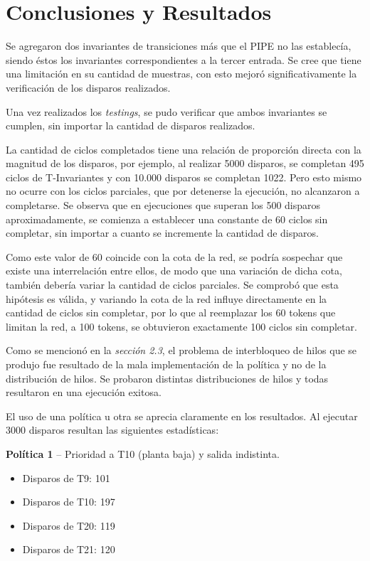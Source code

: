 \documentclass[12pt,a4paper]{article}
\begin{document}
\section{Conclusiones y Resultados}
Se agregaron dos invariantes de transiciones más que el PIPE no las establecía, siendo éstos los invariantes correspondientes a la tercer entrada. Se cree que tiene una limitación en su cantidad de muestras, con esto mejoró significativamente la verificación de los disparos realizados.

Una vez realizados los \emph{testings}, se pudo verificar que ambos invariantes se cumplen, sin importar la cantidad de disparos realizados.

La cantidad  de ciclos completados tiene una relación de proporción directa con la magnitud de los disparos, por ejemplo, al realizar 5000 disparos, se completan 495 ciclos de T-Invariantes y con 10.000 disparos se completan 1022. Pero esto mismo no ocurre con los ciclos parciales, que por detenerse la ejecución, no alcanzaron a completarse.
Se observa que en ejecuciones que superan los 500 disparos aproximadamente, se comienza a establecer una constante de 60 ciclos sin completar, sin importar a cuanto se incremente la cantidad de disparos.

Como este valor de 60 coincide con la cota de la red, se podría sospechar que existe una interrelación entre ellos, de modo que una variación de dicha cota, también debería variar la cantidad de ciclos parciales. Se comprobó que esta hipótesis es válida, y variando la cota de la red influye directamente en la cantidad de ciclos sin completar, por lo que al reemplazar los 60 tokens que limitan la red, a 100 tokens, se obtuvieron exactamente 100 ciclos sin completar.

Como se mencionó en la \emph{sección 2.3}, el problema de interbloqueo de hilos que se produjo fue resultado de la mala implementación de la política y no de la distribución de hilos. Se probaron distintas distribuciones de hilos y todas resultaron en una ejecución exitosa.

El uso de una política u otra se aprecia claramente en los resultados. Al ejecutar 3000 disparos resultan las siguientes estadísticas:

\textbf{Política 1} -- Prioridad a T10 (planta baja) y salida indistinta.
\begin{itemize}[leftmargin=1.5cm]
    \item Disparos de T9: 101
    \item Disparos de T10: 197
    \item Disparos de T20: 119
    \item Disparos de T21: 120
\end{itemize}
\end{document}
